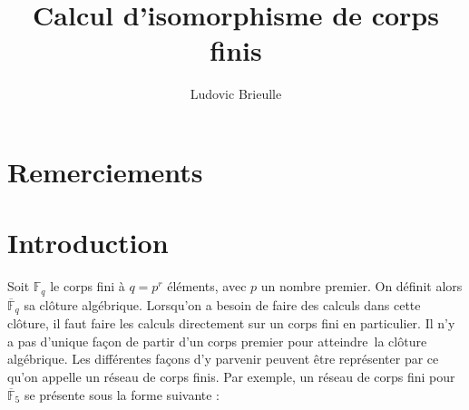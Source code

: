 \documentclass[a4paper]{article} %
\numberwithin{section}{part}
\numberwithin{equation}{section}
\newcommand\GF[1]{\mathbb{F}_{#1}}
\begin{document}
\title{Calcul d'isomorphisme de corps finis}
\author{Ludovic Brieulle}
\newtheorem{thm}{Théorème}[section]
\newtheorem{lem}[thm]{Lemme}
\newtheorem{cor}{Corollaire}[thm]
\newtheorem{prop}[thm]{Proposition}
\theoremstyle{definition}
\newtheorem{defn}[thm]{Définition}
\newtheorem*{ex}{Exemple}
\theoremstyle{remark}
\newtheorem*{rem}{Remarque}

\maketitle
\part*{Remerciements}

\part*{Introduction}
Soit $\GF{q}$ le corps fini à $q = p^r$ éléments, avec $p$ un nombre premier. On
définit alors $\overline{\mathbb{F}}_q$ sa clôture algébrique. Lorsqu'on a 
besoin de faire des calculs dans cette clôture, il faut faire les calculs
directement sur un corps fini en particulier. Il n'y a pas d'unique façon de
partir d'un corps premier pour \og atteindre\fg\, la clôture algébrique. Les
différentes façons d'y parvenir peuvent être représenter par ce qu'on appelle 
un réseau de corps finis. Par exemple, un réseau de corps fini pour 
$\overline{\mathbb{F}}_5$ se présente sous la forme suivante :

\begin{center}
\end{center}
\end{document}
